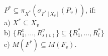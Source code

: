 \begin{theorem}
$P^{\ast} \subseteq \pi_{X^{\ast}} (\sigma_{F^{\ast}[X_v]} (P_{v}))$, if:
\\a) $X^{\ast} \subseteq X_{v}$
\\b) $ \{R^{v}_{1}, \ldots, R^{v}_{s(v)}\} \subseteq \{R^{\ast}_{1}, \ldots,
R^{\ast}_{l}\} $
\\c) $M (F^{\ast}) \subseteq M (F_{v}) $.
\label{th_base}
\end{theorem}
